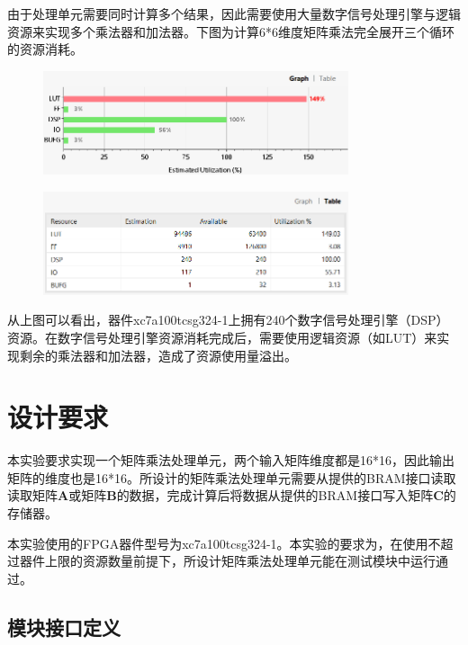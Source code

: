 \documentclass{ctexart}
\begin{document}
由于处理单元需要同时计算多个结果，因此需要使用大量数字信号处理引擎与逻辑资源来实现多个乘法器和加法器。下图为计算6*6维度矩阵乘法完全展开三个循环的资源消耗。

\begin{figure}[H]
    \centering
    \includegraphics[width=0.8\textwidth]{lab4/8.png}
\end{figure}

\begin{figure}[H]
    \centering
    \includegraphics[width=0.8\textwidth]{lab4/9.png}
\end{figure}

从上图可以看出，器件xc7a100tcsg324-1上拥有240个数字信号处理引擎（DSP）资源。在数字信号处理引擎资源消耗完成后，需要使用逻辑资源（如LUT）来实现剩余的乘法器和加法器，造成了资源使用量溢出。


\section{设计要求}

本实验要求实现一个矩阵乘法处理单元，两个输入矩阵维度都是16*16，因此输出矩阵的维度也是16*16。所设计的矩阵乘法处理单元需要从提供的BRAM接口读取读取矩阵$\boldsymbol{A}$或矩阵$\boldsymbol{B}$的数据，完成计算后将数据从提供的BRAM接口写入矩阵$\boldsymbol{C}$的存储器。

本实验使用的FPGA器件型号为xc7a100tcsg324-1。本实验的要求为，在使用不超过器件上限的资源数量前提下，所设计矩阵乘法处理单元能在测试模块中运行通过。


\subsection{模块接口定义}
\end{document}

